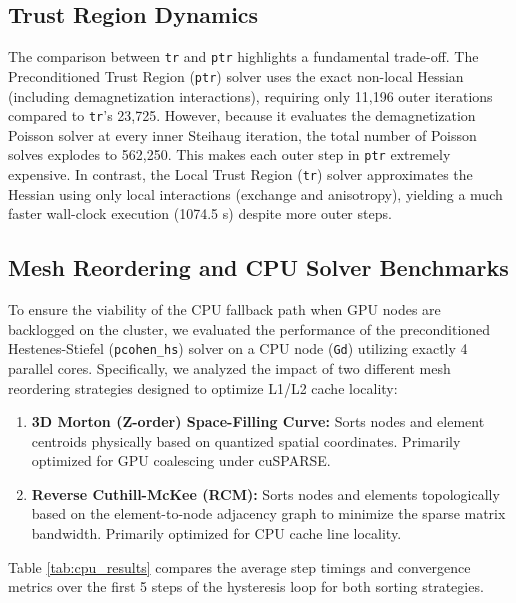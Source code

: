 \documentclass[11pt,a4paper]{article}
\begin{document}
\subsection{Trust Region Dynamics}
The comparison between \texttt{tr} and \texttt{ptr} highlights a fundamental trade-off. The Preconditioned Trust Region (\texttt{ptr}) solver uses the exact non-local Hessian (including demagnetization interactions), requiring only 11,196 outer iterations compared to \texttt{tr}'s 23,725. However, because it evaluates the demagnetization Poisson solver at every inner Steihaug iteration, the total number of Poisson solves explodes to 562,250. This makes each outer step in \texttt{ptr} extremely expensive. In contrast, the Local Trust Region (\texttt{tr}) solver approximates the Hessian using only local interactions (exchange and anisotropy), yielding a much faster wall-clock execution (1074.5 s) despite more outer steps.

\subsection{Mesh Reordering and CPU Solver Benchmarks}
To ensure the viability of the CPU fallback path when GPU nodes are backlogged on the cluster, we evaluated the performance of the preconditioned Hestenes-Stiefel (\texttt{pcohen\_hs}) solver on a CPU node (\texttt{Gd}) utilizing exactly 4 parallel cores. Specifically, we analyzed the impact of two different mesh reordering strategies designed to optimize L1/L2 cache locality:
\begin{enumerate}
    \item \textbf{3D Morton (Z-order) Space-Filling Curve:} Sorts nodes and element centroids physically based on quantized spatial coordinates. Primarily optimized for GPU coalescing under cuSPARSE.
    \item \textbf{Reverse Cuthill-McKee (RCM):} Sorts nodes and elements topologically based on the element-to-node adjacency graph to minimize the sparse matrix bandwidth. Primarily optimized for CPU cache line locality.
\end{enumerate}

Table \ref{tab:cpu_results} compares the average step timings and convergence metrics over the first 5 steps of the hysteresis loop for both sorting strategies.
\end{document}
